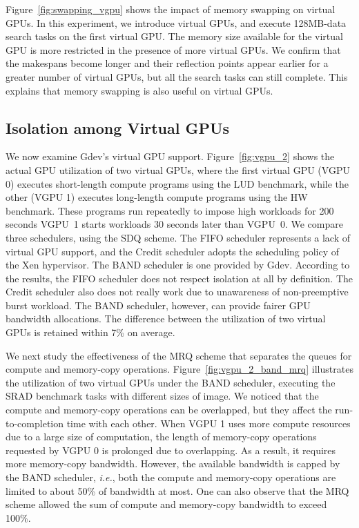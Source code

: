 Figure~\ref{fig:swapping_vgpu} shows the impact of memory swapping on
virtual GPUs.
In this experiment, we introduce virtual GPUs, and execute 128MB-data
search tasks on the first virtual GPU.
The memory size available for the virtual GPU is more restricted in
the presence of more virtual GPUs.
We confirm that the makespans become longer and their reflection points
appear earlier for a greater number of virtual GPUs, but all the search
tasks can still complete.
This explains that memory swapping is also useful on virtual GPUs.

\vspace{-0.25em}
\subsection{Isolation among Virtual GPUs}
\vspace{-0.25em}

We now examine Gdev's virtual GPU support.
Figure~\ref{fig:vgpu_2} shows the actual GPU utilization of two virtual
GPUs, where the first virtual GPU (VGPU 0) executes short-length compute
programs using the LUD benchmark, while the other (VGPU 1) executes
long-length compute programs using the HW benchmark.
These programs run repeatedly to impose high workloads for 200 seconds
VGPU~1 starts workloads 30 seconds later than VGPU~0.
We compare three schedulers, using the SDQ scheme.
The FIFO scheduler represents a lack of virtual GPU support, and
the Credit scheduler adopts the scheduling policy of the Xen
hypervisor.
The BAND scheduler is one provided by Gdev.
According to the results, the FIFO scheduler does not respect isolation
at all by definition.
The Credit scheduler also does not really work due to unawareness of
non-preemptive burst workload.
The BAND scheduler, however, can provide fairer GPU bandwidth allocations.
The difference between the utilization of two virtual GPUs is retained
within 7\% on average.

We next study the effectiveness of the MRQ scheme that separates the
queues for compute and memory-copy operations.
Figure~\ref{fig:vgpu_2_band_mrq} illustrates the utilization of two
virtual GPUs under the BAND scheduler, executing the SRAD benchmark
tasks with different sizes of image.
We noticed that the compute and memory-copy operations can be
overlapped, but they affect the run-to-completion time with each other.
When VGPU 1 uses more compute resources due to a large size of
computation, the length of memory-copy operations requested by VGPU 0 is
prolonged due to overlapping.
As a result, it requires more memory-copy bandwidth.
However, the available bandwidth is capped by the BAND scheduler,
\textit{i.e.}, both the compute and memory-copy operations are limited 
to about 50\% of bandwidth at most.
One can also observe that the MRQ scheme allowed the sum of compute and
memory-copy bandwidth to exceed 100\%.

